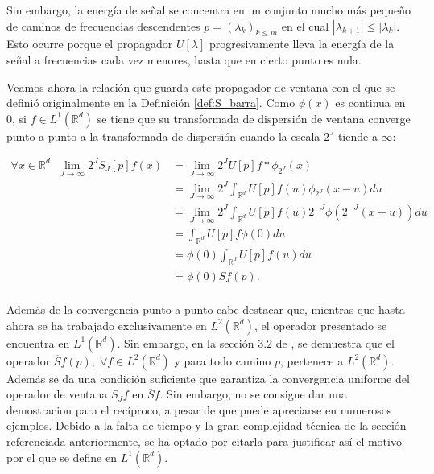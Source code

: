 \medskip

\noindent Sin embargo, la energía de señal se concentra en un conjunto mucho más pequeño de caminos de frecuencias descendentes $p=(\lambda_k)_{k\leq m}$ en el cual $|\lambda_{k+1}| \leq |\lambda_k|$. Esto ocurre porque el propagador $U[\lambda]$ progresivamente lleva la energía de la señal a frecuencias cada vez menores, hasta que en cierto punto es nula.

\medskip

\noindent Veamos ahora la relación que guarda este propagador de ventana con el que se definió originalmente en la Definición \ref{def:S_barra}. Como $\phi(x)$ es continua en $0$, si $f\in L^1 (\mathbb{R}^d)$ se tiene que su transformada de dispersión de ventana converge punto a punto a la transformada de dispersión cuando la escala $2^J$ tiende a $\infty$: 

\begin{align*}
    \forall x \in \mathbb{R}^d \;\; \lim_{J \rightarrow \infty} 2^{J} S_J[p]f(x) 
    &=\lim_{J \rightarrow \infty} 2^{J} U[p]f \ast \phi_{2^J}(x) \\
    &=\lim_{J \rightarrow \infty} 2^{J} \int_{\mathbb{R}^d} U[p]f(u)\phi_{2^J}(x-u) du \\
    &=\lim_{J \rightarrow \infty} 2^{J} \int_{\mathbb{R}^d} U[p]f(u) 2^{-J} \phi(2^{-J}(x-u)) du   \\
    &= \int_{\mathbb{R}^d} U[p]f \phi(0) du  \\
    &=\phi(0)\int_{\mathbb{R}^d}U[p]f(u) du \\
    &= \phi(0)\overline{Sf}(p).\\ 
\end{align*}

\medskip

\noindent  Además de la convergencia punto a punto cabe destacar que, mientras que hasta ahora se ha trabajado exclusivamente en $L^2(\mathbb{R}^d)$, el operador presentado se encuentra en $L^1(\mathbb{R}^d)$. Sin embargo, en la sección $3.2$ de \cite{GroupInvariantScattering}, se demuestra que el operador $\overline{S}f(p), \; \forall f \in L^2(\mathbb{R}^d)$ y para todo camino $p$, pertenece a $L^2(\mathbb{R}^d)$. Además se da una condición suficiente que garantiza la convergencia uniforme del operador de ventana $S_Jf$ en $\overline{S}f$. Sin embargo, no se consigue dar una demostracion para el recíproco, a pesar de que puede apreciarse en numerosos ejemplos. Debido a la falta de tiempo y la gran complejidad técnica de la sección referenciada anteriormente, se ha optado por citarla para justificar así el motivo por el que se define en $L^1(\mathbb{R}^d)$.



